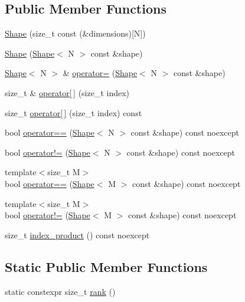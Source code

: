\subsection*{Public Member Functions}
\begin{DoxyCompactItemize}
\item 
\hyperlink{classtensor_1_1Shape_a5d695f5279b343abba4ea627abf87be8}{Shape} (size\+\_\+t const (\&dimensions)\mbox{[}N\mbox{]})
\item 
\hyperlink{classtensor_1_1Shape_ae79ac481be51bedf0cb10e4f0df3fb04}{Shape} (\hyperlink{classtensor_1_1Shape}{Shape}$<$ N $>$ const \&shape)
\item 
\hyperlink{classtensor_1_1Shape}{Shape}$<$ N $>$ \& \hyperlink{classtensor_1_1Shape_af3d592f1861442f6c5a2b2bae6e2ef59}{operator=} (\hyperlink{classtensor_1_1Shape}{Shape}$<$ N $>$ const \&shape)
\item 
size\+\_\+t \& \hyperlink{classtensor_1_1Shape_a699f4991f4c066a41be666528b87fa7f}{operator\mbox{[}$\,$\mbox{]}} (size\+\_\+t index)
\item 
size\+\_\+t \hyperlink{classtensor_1_1Shape_a88f0961f524db84e51bd87aaa65a072b}{operator\mbox{[}$\,$\mbox{]}} (size\+\_\+t index) const 
\item 
bool \hyperlink{classtensor_1_1Shape_a5fbad55446e02d3e503f45c40bfac8cf}{operator==} (\hyperlink{classtensor_1_1Shape}{Shape}$<$ N $>$ const \&shape) const noexcept
\item 
bool \hyperlink{classtensor_1_1Shape_ad761b43ba7f978fe723a919c9f43e8bd}{operator!=} (\hyperlink{classtensor_1_1Shape}{Shape}$<$ N $>$ const \&shape) const noexcept
\item 
{\footnotesize template$<$size\+\_\+t M$>$ }\\bool \hyperlink{classtensor_1_1Shape_af4debc54c4d8a8da0f26c507ba84fd7e}{operator==} (\hyperlink{classtensor_1_1Shape}{Shape}$<$ M $>$ const \&shape) const noexcept
\item 
{\footnotesize template$<$size\+\_\+t M$>$ }\\bool \hyperlink{classtensor_1_1Shape_a2ab0aa731f70ccc2f0216ad60d47dde1}{operator!=} (\hyperlink{classtensor_1_1Shape}{Shape}$<$ M $>$ const \&shape) const noexcept
\item 
size\+\_\+t \hyperlink{classtensor_1_1Shape_aed040be17080abd3ca3b10b0805e47ed}{index\+\_\+product} () const noexcept
\end{DoxyCompactItemize}
\subsection*{Static Public Member Functions}
\begin{DoxyCompactItemize}
\item 
static constexpr size\+\_\+t \hyperlink{classtensor_1_1Shape_a1e2914e4c747ad6dc6d46c2a991541fd}{rank} ()
\end{DoxyCompactItemize}
